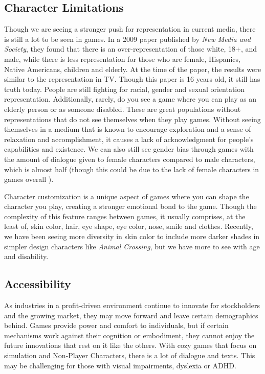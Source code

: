 \documentclass[10pt,twocolumn]{article}
\begin{document}
\subsection{Character Limitations}
Though we are seeing a stronger push for representation in current media, there is still a lot to be seen in games. In a 2009 paper published by \textit{New Media and Society}, they found that there is an over-representation of those white, 18+, and male, while there is less representation for those who are female, Hispanics, Native Americans, children and elderly. At the time of the paper, the results were similar to the representation in TV. Though this paper is 16 years old, it still has truth today. People are still fighting for racial, gender and sexual orientation representation. Additionally, rarely, do you see a game where you can play as an elderly person or as someone disabled. These are great populations without representations that do not see themselves when they play games. Without seeing themselves in a medium that is known to encourage exploration and a sense of relaxation and accomplishment, it causes a lack of acknowledgment for people's capabilities and existence. We can also still see gender bias through games with the amount of dialogue given to female characters compared to male characters, which is almost half (though this could be due to the lack of female characters in games overall ).\cite{Rennick_Clinton_Ioannidou_Oh_Clooney_T._Healy_Roberts}

Character customization is a unique aspect of games where you can shape the character you play, creating a stronger emotional bond to the game. Though the complexity of this feature ranges between games, it usually comprises, at the least of, skin color, hair, eye shape, eye color, nose, smile and clothes. Recently, we have been seeing more diversity in skin color to include more darker shades in simpler design characters like \textit{Animal Crossing}, but we have more to see with age and disability.

\subsection{Accessibility}
As industries in a profit-driven environment continue to innovate for stockholders and the growing market, they may move forward and leave certain demographics behind. Games provide power and comfort to individuals, but if certain mechanisms work against their cognition or embodiment, they cannot enjoy the future innovations that rest on it like the others. With cozy games that focus on simulation and Non-Player Characters, there is a lot of dialogue and texts. This may be challenging for those with visual impairments, dyslexia or ADHD.\cite{Gaming_Read_2022} 
\end{document}
